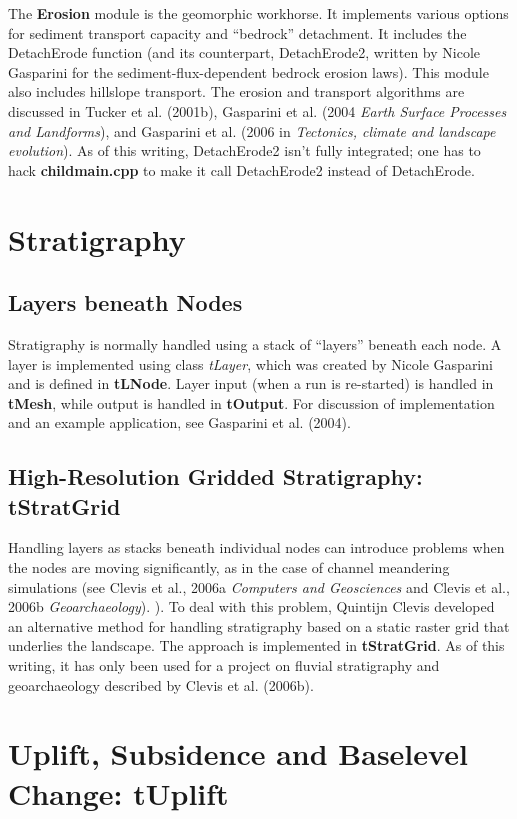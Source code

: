 \documentclass[12pt]{article}
\begin{document}
The {\bf Erosion} module is the geomorphic workhorse. It implements
various options for sediment transport capacity and ``bedrock''
detachment. It includes the DetachErode function (and its counterpart,
DetachErode2, written by Nicole Gasparini for the sediment-flux-dependent bedrock erosion laws). This module also includes
hillslope transport. The erosion and transport algorithms are discussed in Tucker et al. (2001b),
Gasparini et al. (2004 {\em Earth
Surface Processes and Landforms}), and Gasparini et al. (2006 in {\em Tectonics, climate and landscape evolution}). As of this writing, DetachErode2 isn't fully integrated; one has to hack {\bf childmain.cpp} to make it call DetachErode2 instead of DetachErode.


\section{Stratigraphy}

\subsection{Layers beneath Nodes}

Stratigraphy is normally handled using a stack of ``layers'' beneath each node.
A layer is implemented using class {\em tLayer}, which was created by Nicole Gasparini and is defined in
{\bf tLNode}. Layer input (when a run is re-started) is handled in
{\bf tMesh}, while output is handled in {\bf tOutput}. For discussion of implementation and an example application, see Gasparini et al. (2004).


\subsection{High-Resolution Gridded Stratigraphy: tStratGrid}

Handling layers as stacks beneath individual nodes can introduce problems when
the nodes are moving significantly, as in the case of channel meandering
simulations (see Clevis et al., 2006a {\em Computers and Geosciences} and Clevis et al., 2006b
{\em Geoarchaeology}).
). To deal with this problem, Quintijn
Clevis developed an alternative method for handling stratigraphy based on a 
static raster grid that underlies the landscape. The approach is implemented
in {\bf tStratGrid}. As of this writing, it has only been used for a project
on fluvial stratigraphy and geoarchaeology described by Clevis et al. (2006b).

\section{Uplift, Subsidence and Baselevel Change: tUplift}
\end{document}
